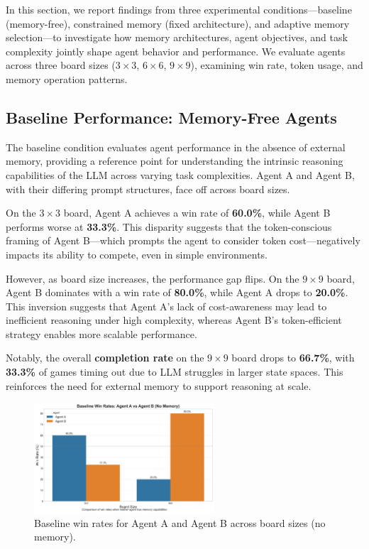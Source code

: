 \documentclass[10pt]{article}
\begin{document}
In this section, we report findings from three experimental conditions---baseline (memory-free), constrained memory (fixed architecture), and adaptive memory selection---to investigate how memory architectures, agent objectives, and task complexity jointly shape agent behavior and performance. We evaluate agents across three board sizes ($3\times3$, $6\times6$, $9\times9$), examining win rate, token usage, and memory operation patterns.

\subsection{Baseline Performance: Memory-Free Agents}

The baseline condition evaluates agent performance in the absence of external memory, providing a reference point for understanding the intrinsic reasoning capabilities of the LLM across varying task complexities. Agent A and Agent B, with their differing prompt structures, face off across board sizes.

On the $3\times3$ board, Agent A achieves a win rate of \textbf{60.0\%}, while Agent B performs worse at \textbf{33.3\%}. This disparity suggests that the token-conscious framing of Agent B---which prompts the agent to consider token cost---negatively impacts its ability to compete, even in simple environments.

However, as board size increases, the performance gap flips. On the $9\times9$ board, Agent B dominates with a win rate of \textbf{80.0\%}, while Agent A drops to \textbf{20.0\%}. This inversion suggests that Agent A's lack of cost-awareness may lead to inefficient reasoning under high complexity, whereas Agent B's token-efficient strategy enables more scalable performance.

Notably, the overall \textbf{completion rate} on the $9\times9$ board drops to \textbf{66.7\%}, with \textbf{33.3\%} of games timing out due to LLM struggles in larger state spaces. This reinforces the need for external memory to support reasoning at scale.

\begin{figure}[H]
\centering
\includegraphics[width=0.6\textwidth]{figures/memory_baseline/baseline_win_rates.png}
\caption{Baseline win rates for Agent A and Agent B across board sizes (no memory).}
\label{fig:baseline_win_rates}
\end{figure}
\end{document}
